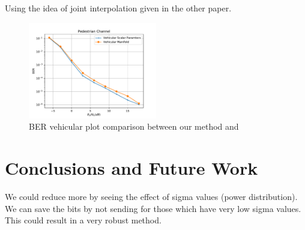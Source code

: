 \documentclass[conference]{IEEEtran}
\begin{document}
Using the idea of joint interpolation given in the other paper.

\begin{figure}
\includegraphics[width=0.5\textwidth]{images/vehicular_ber.pdf}
\caption{BER vehicular plot comparison between our method and \cite{Gupt1905:Predictive}}
\label{ber_overview}
\vspace{-5pt}
\end{figure}
\section{Conclusions and Future Work}
\label{section4}

We could reduce more by seeing the effect of sigma values (power distribution). We can save the bits by not sending for those which have very low sigma values. This could result in a very robust method.

\vspace{-4pt}














\renewcommand{\bibfont}{\footnotesize}




\end{document}
